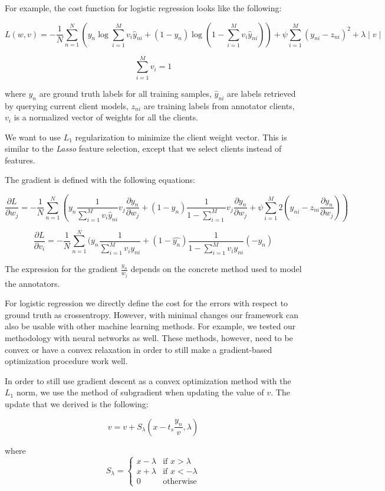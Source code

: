 \documentclass{llncs}
\begin{document}
For example, the cost function for logistic regression looks like the following:

$$ L(w,v)= -\frac{1}{N} \sum_{n=1}^N (y_n \log \sum_{i=1}^M v_i\hat{y}_{ni} + (1-y_n) \log(1-\sum_{i=1}^M v_i \hat{y}_{ni})) + \psi \sum_{i=1}^{M} (y_{ni} - z_{ni})^2+\lambda \mid v \mid$$

$$ \sum_{i=1}^{M} v_i = 1 $$

where $y_n$ are ground truth labels for all training samples, $\hat{y}_{ni}$ are labels retrieved by querying  current client models, $z_{ni}$ are training labels from annotator clients, $v_i$ is a normalized vector of weights for all the clients.  

We want to use $L_1$ regularization to minimize the client weight vector. This is similar to the \textit{Lasso} feature selection, except that we select clients instead of features. 

The gradient is defined with the following equations:

$$ \frac{\partial L}{\partial w_j} = -\frac{1}{N} \sum_{n=1}^N (y_n \frac{1}{\sum_{i=1}^M v_i \hat{y}_{ni}} v_j \frac{\partial y_n}{\partial w_j} + (1-y_n) \frac{1}{1-\sum_{i=1}^M } v_j \frac{\partial y_n}{\partial w_j} + \psi \sum_{i=1}^M 2 (y_{ni} - z_{ni} \frac{\partial y_n}{\partial w_j}  ))$$

$$ \frac{\partial L}{\partial v_i} =  -\frac{1}{N} \sum_{n=1}^N (y_n \frac{1}{\sum_{i=1}^M v_i y_{ni}} + (1-\hat{y_n}) \frac{1} {1-\sum_{i=1}^M v_i y_{ni}} (-y_n) $$

The expression for the gradient $ \frac{y_n}{w_j}$ depends on the concrete method used to model the annotators.

 


For logistic regression we directly define the cost for the errors with respect to ground truth as crossentropy. However, with minimal changes our framework can also be usable with other machine learning methods. For example, we tested our methodology with neural networks as well. These methods, however, need to be convex or have a convex relaxation in order to still make a gradient-based optimization procedure work well.

In order to still use gradient descent as a convex optimization method with the $L_1$ norm, we use the method of subgradient when updating the value of $v$. The update that we derived is the following:

$$ v= v + S_{\lambda} (x-t_s \frac{y_n}{v}, \lambda)$$

where
$$ S_{\lambda} = 
\left\{
	\begin{array}{ll}
		x-\lambda  & \mbox{if } x > \lambda  \\
		x+\lambda & \mbox{if } x < -\lambda \\
		0 & \mbox{otherwise}
	\end{array}
\right.
$$
\end{document}
